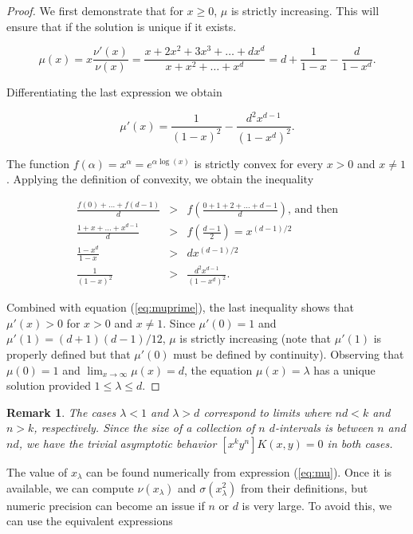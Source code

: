 \documentclass{article}
\newtheorem{remark}{Remark}
\begin{document}
\begin{proof}
We first demonstrate that for $x \geq 0$, $\mu$ is strictly increasing.
This will ensure that if the solution is unique if it exists.

\begin{equation}
\label{eq:mu}
\mu(x) = x\frac{\nu'(x)}{\nu(x)} =
\frac{x+2x^2+3x^3+\ldots+dx^d}{x+x^2+\ldots+x^d} =
d+\frac{1}{1-x} - \frac{d}{1-x^d}.
\end{equation} 

Differentiating the last expression we obtain

\begin{equation}
\label{eq:muprime}
\mu'(x) = \frac{1}{(1-x)^2} -\frac{d^2x^{d-1}}{(1-x^d)^2}.
\end{equation}

The function $f(\alpha) = x^{\alpha} = e^{\alpha \log(x)}$ is strictly
convex for every $x > 0$ and $x \neq 1$. Applying the definition of
convexity, we obtain the inequality

\begin{eqnarray*}
\frac{f(0)+\ldots+f(d-1)}{d} &>&
f\left(\frac{0+1+2+\ldots+d-1}{d}\right) \text{, and then} \\
\frac{1+x+\ldots+x^{d-1}}{d} &>& f\left(\frac{d-1}{2}\right)
= x^{(d-1)/2} \\
\frac{1-x^d}{1-x} &>& dx^{(d-1)/2} \\
\frac{1}{(1-x)^2} &>& \frac{d^2x^{d-1}}{(1-x^d)^2}.
\end{eqnarray*}

Combined with equation (\ref{eq:muprime}), the last inequality shows that
$\mu'(x) > 0$ for $x > 0$ and $x \neq 1$. Since $\mu'(0) = 1$ and $\mu'(1)
= (d+1)(d-1)/12$, $\mu$ is strictly increasing (note that $\mu'(1)$ is
properly defined but that $\mu'(0)$ must be defined by continuity).
Observing that $\mu(0) = 1$ and $\lim_{x\rightarrow\infty} \mu(x) = d$,
the equation $\mu(x) = \lambda$ has a unique solution provided $1 \leq
\lambda \leq d$.
\end{proof}

\begin{remark}
The cases $\lambda < 1$ and $\lambda > d$ correspond to limits where $nd <
k$ and $n > k$, respectively. Since the size of a collection of $n$
$d$-intervals is between $n$ and $nd$, we have the trivial asymptotic
behavior $[x^ky^n]K(x,y) = 0$ in both cases.
\end{remark}


The value of $x_\lambda$ can be found numerically from expression
(\ref{eq:mu}).  Once it is available, we can compute $\nu(x_\lambda)$ and
$\sigma(x_\lambda^2)$ from their definitions, but numeric precision can
become an issue if $n$ or $d$ is very large. To avoid this, we can use the
equivalent expressions
\end{document}
